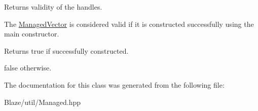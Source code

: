 Returns validity of the handles. 

The \hyperlink{classblaze_1_1util_1_1ManagedVector}{Managed\+Vector} is considered valid if it is constructed successfully using the main constructor.

\begin{DoxyReturn}{Returns}
true if successfully constructed. 

false otherwise. 
\end{DoxyReturn}


The documentation for this class was generated from the following file\+:\begin{DoxyCompactItemize}
\item 
Blaze/util/Managed.\+hpp\end{DoxyCompactItemize}
